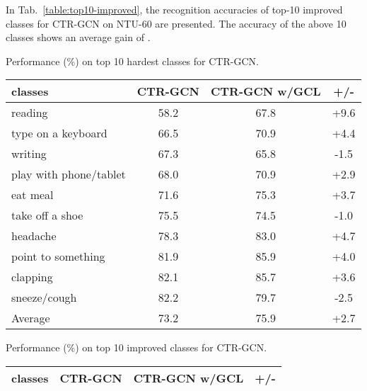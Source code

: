 \documentclass{article} \usepackage{iclr2023_conference,times}
\begin{document}
In Tab.~\ref{table:top10-improved}, the recognition accuracies of top-10 improved classes for CTR-GCN on NTU-60 are presented. The accuracy of the above 10 classes shows an average gain of .

\begin{minipage}{\textwidth}
\begin{minipage}[t]{0.5\textwidth}
\centering
\makeatletter{}
\setlength\tabcolsep{2.5pt}
   \scriptsize
   \caption{Performance (\%) on top 10 hardest classes for CTR-GCN.}
    \begin{tabular}{l||c|c|c}
    \rowcolor{gray!30} classes & CTR-GCN & CTR-GCN w/GCL & +/- \\ \hline \hline
    reading                & 58.2    & 67.8          & +9.6      \\ \hline
    type on a keyboard     & 66.5    & 70.9          & +4.4      \\ \hline
    writing                & 67.3    & 65.8          & -1.5     \\ \hline
    play with phone/tablet & 68.0    & 70.9          & +2.9      \\ \hline
    eat meal               & 71.6    & 75.3          & +3.7      \\ \hline
    take off a shoe        & 75.5    & 74.5          & -1.0     \\ \hline
    headache               & 78.3    & 83.0          & +4.7      \\ \hline
    point to something     & 81.9    & 85.9          & +4.0      \\ \hline
    clapping               & 82.1    & 85.7          & +3.6      \\ \hline
    sneeze/cough           & 82.2    & 79.7          & -2.5     \\ \hline \hline
    Average                & 73.2    & 75.9          & +2.7     \\ \hline
    \end{tabular}
\label{table:table:top10-hardest}
\end{minipage}
\hspace{3mm}
\begin{minipage}[t]{0.5\textwidth}
\centering
\makeatletter{}
\setlength\tabcolsep{2.5pt}
   \scriptsize
   \caption{Performance (\%) on top 10 improved classes for CTR-GCN.}
    \begin{tabular}{l||c|c|c}
    \rowcolor{gray!30} classes & CTR-GCN & CTR-GCN w/GCL & +/-      \\ \hline \hline

\end{tabular}
\end{minipage}
\end{minipage}
\end{document}
